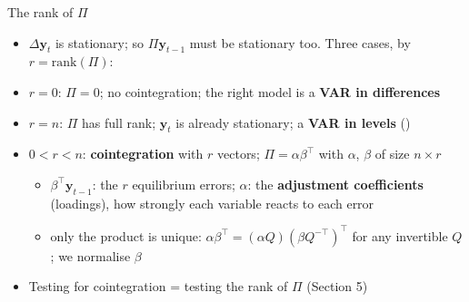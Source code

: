 \begin{frame}{The rank of $\Pi$}
\itemsize{\small}
\begin{itemize}
    \item $\Delta\mathbf y_t$ is stationary; so $\Pi\mathbf y_{t-1}$ must be stationary too. Three cases, by $r = \mathrm{rank}(\Pi)$:
    \item $r = 0$: $\Pi = 0$; no cointegration; the right model is a \textbf{VAR in differences}
    \item $r = n$: $\Pi$ has full rank; $\mathbf y_t$ is already stationary; a \textbf{VAR in levels} ()
    \item $0 < r < n$: \textbf{cointegration} with $r$ vectors; $\Pi = \alpha\beta^\top$ with $\alpha$, $\beta$ of size $n \times r$
    \begin{itemize}
        \item $\beta^\top\mathbf y_{t-1}$: the $r$ equilibrium errors; $\alpha$: the \textbf{adjustment coefficients} (loadings), how strongly each variable reacts to each error
        \item only the product is unique: $\alpha\beta^\top = (\alpha Q)(\beta Q^{-\top})^\top$ for any invertible $Q$; we normalise $\beta$
    \end{itemize}
    \item Testing for cointegration = testing the rank of $\Pi$ (Section 5)
\end{itemize}
\end{frame}

